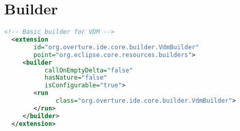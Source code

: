 \section{Builder}




\begin{lstlisting}[language=XML]
<!-- Basic builder for VDM -->
  <extension
        id="org.overture.ide.core.builder.VdmBuilder"
        point="org.eclipse.core.resources.builders">
     <builder
           callOnEmptyDelta="false"
           hasNature="false"
           isConfigurable="true">
        <run
              class="org.overture.ide.core.builder.VdmBuilder">
        </run>
     </builder>
  </extension>
\end{lstlisting}
